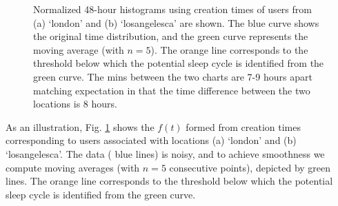 \begin{figure}[htp]
   \hspace*{\fill}   %
   \caption[Example Time Distributions]{Normalized 48-hour histograms using creation times of users from (a) `london' and (b) `losangelesca' are shown. The blue curve shows the original time distribution, and the green curve represents the moving average (with $n=5$). The orange line corresponds to the threshold below which the potential sleep cycle is identified from the green curve. The mins between the two charts are 7-9 hours apart matching expectation in that the time difference between the two locations is 8 hours.} \label{fig_1}
\end{figure}

As an illustration, Fig. \ref{fig_1} shows the $f(t)$ formed from creation times corresponding to users associated with %
locations (a) `london' and (b) `losangelesca'. %
The data (%
blue lines) is noisy, and to achieve smoothness we compute moving averages (with $n=5$ consecutive points), %
depicted by green lines.%
The orange line corresponds to the threshold below which the potential sleep cycle is identified from the green curve.

